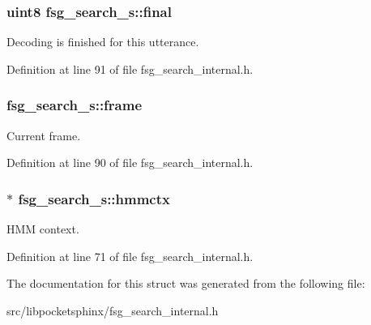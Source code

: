 \subsubsection[{final}]{\setlength{\rightskip}{0pt plus 5cm}uint8 fsg\-\_\-search\-\_\-s\-::final}\label{structfsg__search__s_a5139d7ab35ae18407e06e78e1778f857}


Decoding is finished for this utterance. 



Definition at line 91 of file fsg\-\_\-search\-\_\-internal.\-h.

\subsubsection[{frame}]{ fsg\-\_\-search\-\_\-s\-::frame}\label{structfsg__search__s_acdac4164d14d531b14c11a823dd22893}


Current frame. 



Definition at line 90 of file fsg\-\_\-search\-\_\-internal.\-h.

\subsubsection[{hmmctx}]{$\ast$ fsg\-\_\-search\-\_\-s\-::hmmctx}\label{structfsg__search__s_a7407bdf5f311caf9d46817b3387b798c}


H\-M\-M context. 



Definition at line 71 of file fsg\-\_\-search\-\_\-internal.\-h.



The documentation for this struct was generated from the following file\-:\begin{DoxyCompactItemize}
\item 
src/libpocketsphinx/fsg\-\_\-search\-\_\-internal.\-h\end{DoxyCompactItemize}

